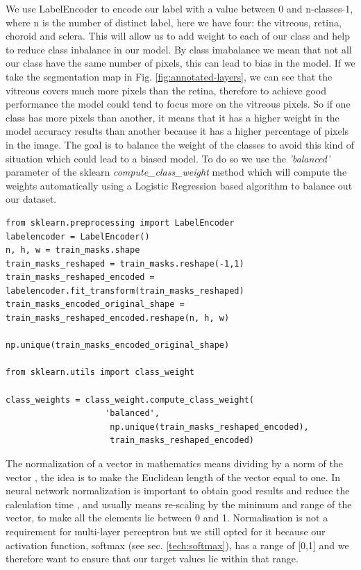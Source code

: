 \documentclass[12pt,a4paper]{scrartcl}
\begin{document}
We use LabelEncoder \cite{scikit-learn} to encode our label with a value between 0 and n-classes-1, where n is the number of distinct label, here we have four: the vitreous, retina, choroid and sclera. This will allow us to add weight to each of our class and help to reduce class inbalance in our model. By class imabalance we mean that not all our class have the same number of pixels, this can lead to bias in the model. If we take the segmentation map in Fig. \ref{fig:annotated-layers}, we can see that the vitreous covers much more pixels than the retina, therefore to achieve good performance the model could tend to focus more on the vitreous pixels. So if one class has more pixels than another, it means that it has a higher weight in the model accuracy results than another because it has a higher percentage of pixels in the image. The goal is to balance the weight of the classes to avoid this kind of situation which could lead to a biased model. To do so we use the \emph{'balanced'} parameter of the sklearn\cite{scikit-learn} \emph{compute\_class\_weight} method which will compute the weights automatically using a Logistic Regression based algorithm \cite{scikit-learn} to balance out our dataset. 

\begin{lstlisting}[caption={Encoding of the labels and weights attributions to the class, code from \emph{train.py} file}]
from sklearn.preprocessing import LabelEncoder
labelencoder = LabelEncoder()
n, h, w = train_masks.shape
train_masks_reshaped = train_masks.reshape(-1,1)
train_masks_reshaped_encoded = labelencoder.fit_transform(train_masks_reshaped)
train_masks_encoded_original_shape = train_masks_reshaped_encoded.reshape(n, h, w)

np.unique(train_masks_encoded_original_shape)

from sklearn.utils import class_weight

class_weights = class_weight.compute_class_weight(
                    'balanced',
                     np.unique(train_masks_reshaped_encoded),
                     train_masks_reshaped_encoded)
\end{lstlisting}

The normalization of a vector in mathematics means dividing by a norm of the vector \cite{Normalization_Vector_Machines:2001}, the idea is to make the Euclidean length of the vector equal to one. In neural network normalization is important to obtain good results and reduce the calculation time \cite{Normalizazion_NN}, and usually means re-scaling by the minimum and range of the vector, to make all the elements lie between 0 and 1. Normalisation is not a requirement for multi-layer perceptron but we still opted for it because our activation function, softmax (see sec. \ref{tech:softmax}), has a range of [0,1] and we therefore want to ensure that our target values lie within that range.
\end{document}
